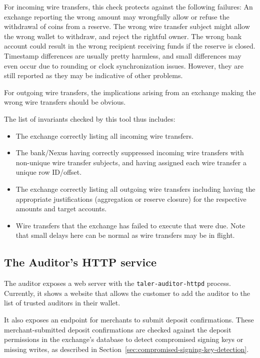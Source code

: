 For incoming wire transfers, this check protects against the following
failures: An exchange reporting the wrong amount may wrongfully allow or
refuse the withdrawal of coins from a reserve. The wrong wire transfer subject
might allow the wrong wallet to withdraw, and reject the rightful owner.  The
wrong bank account could result in the wrong recipient receiving funds if the
reserve is closed. Timestamp differences are usually pretty harmless, and
small differences may even occur due to rounding or clock synchronization
issues. However, they are still reported as they may be indicative of other
problems.

For outgoing wire transfers, the implications arising from an exchange making
the wrong wire transfers should be obvious.

The list of invariants checked by this tool thus includes:
\begin{itemize}
\item The exchange correctly listing all incoming wire transfers.
\item The bank/Nexus having correctly suppressed incoming wire
  transfers with non-unique wire transfer subjects, and having
  assigned each wire transfer a unique row ID/offset.
\item The exchange correctly listing all outgoing wire transfers
  including having the appropriate justifications (aggregation
  or reserve closure) for the respective amounts and target accounts.
\item Wire transfers that the exchange has failed to execute that
  were due. Note that small delays here can be normal as
  wire transfers may be in flight.
\end{itemize}


\subsection{The Auditor's HTTP service}

The auditor exposes a web server with the \texttt{taler-auditor-httpd}
process.  Currently, it shows a website that allows the customer to add the
auditor to the list of trusted auditors in their wallet.

It also exposes an endpoint for merchants to submit deposit confirmations.
These merchant-submitted deposit confirmations are checked against the deposit
permissions in the exchange's database to detect compromised signing keys or
missing writes, as described in
Section~\ref{sec:compromised-signing-key-detection}.

